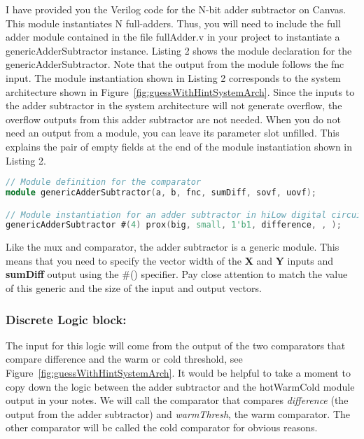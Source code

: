 I have provided you the Verilog code for the N-bit adder subtractor on
Canvas. This module instantiates N full-adders. Thus, you will need to
include the full adder module contained in the file fullAdder.v in your
project to instantiate a genericAdderSubtractor instance. Listing 2
shows the module declaration for the genericAdderSubtractor. Note that
the output from the module follows the fnc input. The module
instantiation shown in Listing 2 corresponds to the system architecture
shown in Figure~\ref{fig:guessWithHintSystemArch}. Since the inputs to the adder subtractor in the
system architecture will not generate overflow, the overflow outputs
from this adder subtractor are not needed. When you do not need an
output from a module, you can leave its parameter slot unfilled. This
explains the pair of empty fields at the end of the module instantiation
shown in Listing 2.

\begin{lstlisting}[language=Verilog,
 caption={Top, module definition for an adder subtractor.  Bottom, module instantation 
 of the adder subtractor in Figure~\ref{fig:guessWithHintSystemArch}.},
 label={listing:2x1muxVerilog},
 frame=single]
// Module definition for the comparator
module genericAdderSubtractor(a, b, fnc, sumDiff, sovf, uovf);

// Module instantiation for an adder subtractor in hiLow digital circuit
genericAdderSubtractor #(4) prox(big, small, 1'b1, difference, , );
\end{lstlisting}


Like the mux and comparator, the adder subtractor is a generic module.
This means that you need to specify the vector width of the \textbf{X}
and \textbf{Y} inputs and \textbf{sumDiff} output using the \#()
specifier. Pay close attention to match the value of this generic and
the size of the input and output vectors.

\hypertarget{discrete-logic-block}{%
\subsubsection{Discrete Logic block:}
\label{discrete-logic-block}}

The input for this logic will come from the output of the two
comparators that compare difference and the warm or cold threshold, see
Figure~\ref{fig:guessWithHintSystemArch}. It would be helpful to take a moment to copy down the logic
between the adder subtractor and the hotWarmCold module output in your
notes. We will call the comparator that compares \emph{difference} (the
output from the adder subtractor) and \emph{warmThresh}, the warm
comparator. The other comparator will be called the cold comparator for
obvious reasons.

